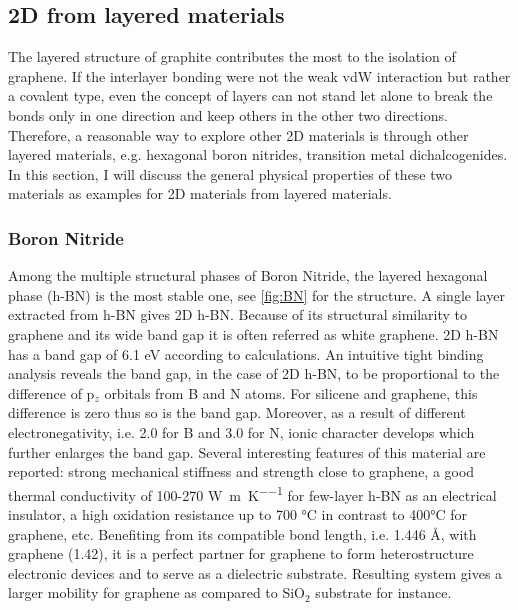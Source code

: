 \subsection{2D from layered materials}

The layered structure of graphite contributes the most to the isolation of graphene. If the interlayer bonding were not the weak vdW interaction but rather a covalent type, even the concept of layers can not stand let alone to break the bonds only in one direction and keep others in the other two directions. Therefore, a reasonable way to explore other 2D materials is through other layered materials, e.g. hexagonal boron nitrides, transition metal dichalcogenides. In this section, I will discuss the general physical properties of these two materials as examples for 2D materials from layered materials.

\subsubsection{Boron Nitride}

Among the multiple structural phases of Boron Nitride, the layered hexagonal phase (h-BN) is the most stable one, see \autoref{fig:BN} for the structure. A single layer extracted from h-BN gives 2D h-BN. Because of its structural similarity to graphene and its wide band gap it is often referred as white graphene\cite{alem2009atomically}. 2D h-BN has a band gap of 6.1 eV according to calculations. An intuitive tight binding analysis reveals the band gap, in the case of 2D h-BN, to be proportional to the difference of p$_z$ orbitals from B and N atoms. For silicene and graphene, this difference is zero thus so is the band gap. Moreover, as a result of different electronegativity, i.e. 2.0 for B and 3.0 for N, ionic character develops which further enlarges the band gap\cite{zhuang2012}. Several interesting features of this material are reported: strong mechanical stiffness and strength close to graphene\cite{Bosak2006}, a good thermal conductivity of 100-270 \si{\watt\per\meter\per\kelvin} for few-layer h-BN\cite{Jo2013} as an electrical insulator, a high oxidation resistance up to 700 \si{\celsius} in contrast to 400\si{\celsius} for graphene\cite{li2016atomically}, etc. Benefiting from its compatible bond length, i.e. 1.446 \AA, with graphene (1.42), it is a perfect partner for graphene to form heterostructure electronic devices  and to serve as a dielectric substrate\cite{Lee2013}. Resulting system gives a larger mobility for graphene as compared to SiO$_2$ substrate\cite{dean2010boron} for instance. 


